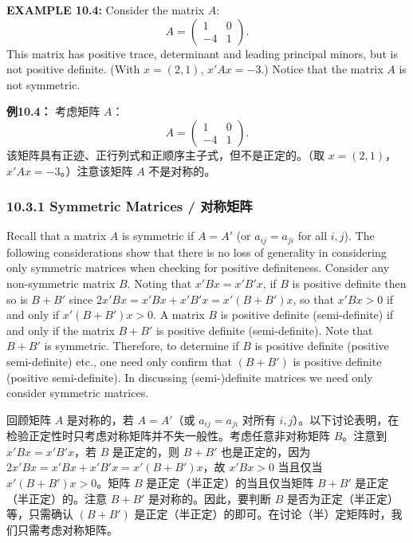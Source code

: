 \begin{original}
\textbf{EXAMPLE 10.4:} Consider the matrix $A$:
\[
A = \begin{pmatrix} 1 & 0 \\ -4 & 1 \end{pmatrix}.
\]
This matrix has positive trace, determinant and leading principal minors, but is not positive definite. (With $x = (2,1)$, $x'Ax = -3$.) Notice that the matrix $A$ is not symmetric.
\end{original}
\begin{translation}
\textbf{例10.4：} 考虑矩阵 $A$：
\[
A = \begin{pmatrix} 1 & 0 \\ -4 & 1 \end{pmatrix}.
\]
该矩阵具有正迹、正行列式和正顺序主子式，但不是正定的。（取 $x = (2,1)$，$x'Ax = -3$。）注意该矩阵 $A$ 不是对称的。
\end{translation}

\subsubsection{10.3.1 Symmetric Matrices / 对称矩阵}

\begin{original}
Recall that a matrix $A$ is symmetric if $A = A'$ (or $a_{ij} = a_{ji}$ for all $i,j$). The following considerations show that there is no loss of generality in considering only symmetric matrices when checking for positive definiteness. Consider any non-symmetric matrix $B$. Noting that $x'Bx = x'B'x$, if $B$ is positive definite then so is $B + B'$ since $2x'Bx = x'Bx + x'B'x = x'(B + B')x$, so that $x'Bx > 0$ if and only if $x'(B + B')x > 0$. A matrix $B$ is positive definite (semi-definite) if and only if the matrix $B + B'$ is positive definite (semi-definite). Note that $B + B'$ is symmetric. Therefore, to determine if $B$ is positive definite (positive semi-definite) etc., one need only confirm that $(B + B')$ is positive definite (positive semi-definite). In discussing (semi-)definite matrices we need only consider symmetric matrices.
\end{original}
\begin{translation}
回顾矩阵 $A$ 是对称的，若 $A = A'$（或 $a_{ij} = a_{ji}$ 对所有 $i,j$）。以下讨论表明，在检验正定性时只考虑对称矩阵并不失一般性。考虑任意非对称矩阵 $B$。注意到 $x'Bx = x'B'x$，若 $B$ 是正定的，则 $B + B'$ 也是正定的，因为 $2x'Bx = x'Bx + x'B'x = x'(B + B')x$，故 $x'Bx > 0$ 当且仅当 $x'(B + B')x > 0$。矩阵 $B$ 是正定（半正定）的当且仅当矩阵 $B + B'$ 是正定（半正定）的。注意 $B + B'$ 是对称的。因此，要判断 $B$ 是否为正定（半正定）等，只需确认 $(B + B')$ 是正定（半正定）的即可。在讨论（半）定矩阵时，我们只需考虑对称矩阵。
\end{translation}

